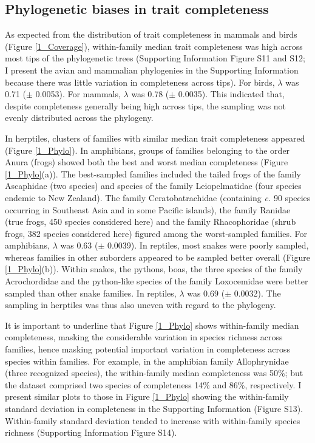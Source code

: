 \subsection{Phylogenetic biases in trait completeness}
As expected from the distribution of trait completeness in mammals and birds (Figure \ref{1_Coverage}), within-family median trait completeness was high across most tips of the phylogenetic trees (Supporting Information Figure S11 and S12; I present the avian and mammalian phylogenies in the Supporting Information because there was little variation in completeness across tips). For birds, $\lambda$ was 0.71 ($\pm$ 0.0053). For mammals, $\lambda$ was 0.78 ($\pm$ 0.0035). This indicated that, despite completeness generally being high across tips, the sampling was not evenly distributed across the phylogeny.

In herptiles, clusters of families with similar median trait completeness appeared (Figure \ref{1_Phylo}). In amphibians, groups of families belonging to the order Anura (frogs) showed both the best and worst median completeness (Figure \ref{1_Phylo}(a)). The best-sampled families included the tailed frogs of the family Ascaphidae (two species) and species of the family Leiopelmatidae (four species endemic to New Zealand). The family Ceratobatrachidae (containing \textit{c.} 90 species occurring in Southeast Asia and in some Pacific islands), the family Ranidae (true frogs, 450 species considered here) and the family Rhacophoridae (shrub frogs, 382 species considered here) figured among the worst-sampled families. For amphibians, $\lambda$ was 0.63 ($\pm$ 0.0039). In reptiles, most snakes were poorly sampled, whereas families in other suborders appeared to be sampled better overall (Figure \ref{1_Phylo}(b)). Within snakes, the pythons, boas, the three species of the family Acrochordidae and the python-like species of the family Loxocemidae were better sampled than other snake families. In reptiles, $\lambda$ was 0.69 ($\pm$ 0.0032). The sampling in herptiles was thus also uneven with regard to the phylogeny.

It is important to underline that Figure \ref{1_Phylo} shows within-family median completeness, masking the considerable variation in species richness across families, hence masking potential important variation in completeness across species within families. For example, in the amphibian family Allophrynidae (three recognized species), the within-family median completeness was 50\%; but the dataset comprised two species of completeness 14\% and 86\%, respectively. I present similar plots to those in Figure \ref{1_Phylo} showing the within-family standard deviation in completeness in the Supporting Information (Figure S13). Within-family standard deviation tended to increase with within-family species richness (Supporting Information Figure S14).

